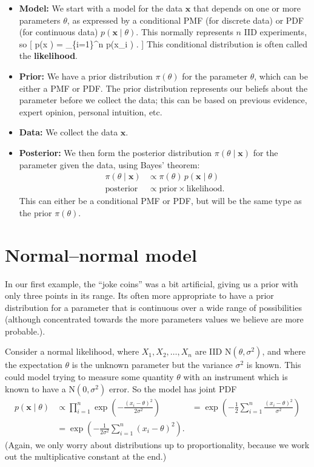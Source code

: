 \documentclass[
  letterpaper,
  DIV=11,
  numbers=noendperiod]{scrreprt}
\providecommand{\tightlist}{%
  \setlength{\itemsep}{0pt}\setlength{\parskip}{0pt}}\usepackage{longtable,booktabs,array}
\theoremstyle{remark}
\begin{document}
\begin{itemize}
\tightlist
\item
  \textbf{Model:} We start with a model for the data \(\mathbf x\) that
  depends on one or more parameters \(\theta\), as expressed by a
  conditional PMF (for discrete data) or PDF (for continuous data)
  \(p(\mathbf x \mid \theta)\). This normally represents \(n\) IID
  experiments, so {[} p(\mathbf x \mid \theta) = \prod\_\{i=1\}\^{}n
  p(x\_i \mid \theta) . {]} This conditional distribution is often
  called the \textbf{likelihood}.
\item
  \textbf{Prior:} We have a prior distribution \(\pi(\theta)\) for the
  parameter \(\theta\), which can be either a PMF or PDF. The prior
  distribution represents our beliefs about the parameter before we
  collect the data; this can be based on previous evidence, expert
  opinion, personal intuition, etc.
\item
  \textbf{Data:} We collect the data \(\mathbf x\).
\item
  \textbf{Posterior:} We then form the posterior distribution
  \(\pi(\theta \mid \mathbf x)\) for the parameter given the data, using
  Bayes' theorem: \begin{align*}
  \pi(\theta \mid \mathbf x) &\propto \pi(\theta)\, p(\mathbf x \mid \theta) \\
  \text{posterior} &\propto \text{prior} \times \text{likelihood} .
  \end{align*} This can either be a conditional PMF or PDF, but will be
  the same type as the prior \(\pi(\theta)\).
\end{itemize}

\hypertarget{normal-normal}{%
\section{Normal--normal model}\label{normal-normal}}

In our first example, the ``joke coins'' was a bit artificial, giving us
a prior with only three points in its range. Its often more appropriate
to have a prior distribution for a parameter that is continuous over a
wide range of possibilities (although concentrated towards the more
parameters values we believe are more probable.).

Consider a normal likelihood, where \(X_1, X_2, \dots, X_n\) are IID
\(\text{N}(\theta, \sigma^2)\), and where the expectation \(\theta\) is
the unknown parameter but the variance \(\sigma^2\) is known. This could
model trying to measure some quantity \(\theta\) with an instrument
which is known to have a \(\text{N}(0,\sigma^2)\) error. So the model
has joint PDF \begin{align*}
p(\mathbf x \mid \theta)
  &\propto \prod_{i=1}^n \exp \left(- \frac{(x_i - \theta)^2}{2\sigma^2}\right)
  &= \exp \left( - \frac{1}{2} \sum_{i=1}^n \frac{(x_i - \theta)^2}{\sigma^2} \right) \\
  &= \exp \left( - \frac{1}{2\sigma^2} \sum_{i=1}^n (x_i - \theta)^2 \right).
\end{align*} (Again, we only worry about distributions up to
proportionality, because we work out the multiplicative constant at the
end.)
\end{document}
